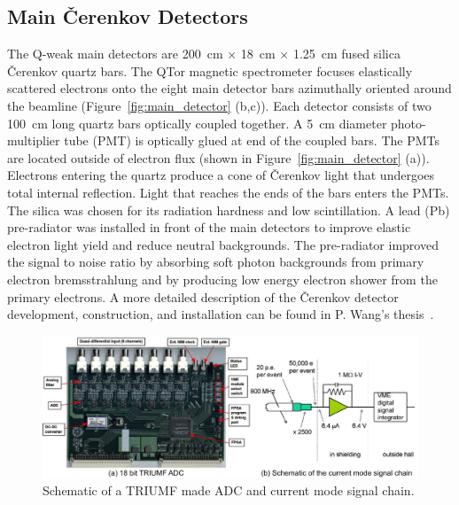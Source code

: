 \subsection{Main \v{C}erenkov Detectors}%
\label{Main Cerenkov Detectors}

The Q-weak main detectors are 200~cm $\times$ 18~cm $\times$ 1.25~cm fused silica \v{C}erenkov quartz bars. The QTor magnetic spectrometer focuses elastically scattered electrons onto the eight main detector bars azimuthally oriented around the beamline (Figure~\ref{fig:main_detector} (b,c)). Each detector consists of two 100~cm long quartz bars optically coupled together.
A 5~cm diameter photo-multiplier tube (PMT) is optically glued at end of the coupled bars.  The PMTs are located outside of electron flux (shown in Figure~\ref{fig:main_detector} (a)). Electrons entering the quartz produce a cone of \v{C}erenkov light that undergoes total internal reflection. Light that reaches the ends of the bars enters the PMTs. The silica was chosen for its radiation hardness and low scintillation. A lead (Pb) pre-radiator was installed in front of the main detectors to improve elastic electron light yield and reduce neutral backgrounds. The pre-radiator improved the signal to noise ratio by absorbing soft photon backgrounds from primary electron bremsstrahlung and by producing low energy electron shower from the primary electrons. A more detailed description of the \v{C}erenkov detector development, construction, and installation can be found in P. Wang's thesis~\cite{peiqing_qweak}.


\begin{singlespace}
\begin{figure}[!h]
	\begin{center}
	\includegraphics[width=15.0cm]{figures/adc}
	\caption
	{Schematic of a TRIUMF made ADC and current mode signal chain.}
	\label{fig:adc}
	\end{center}
\end{figure}
\end{singlespace}


